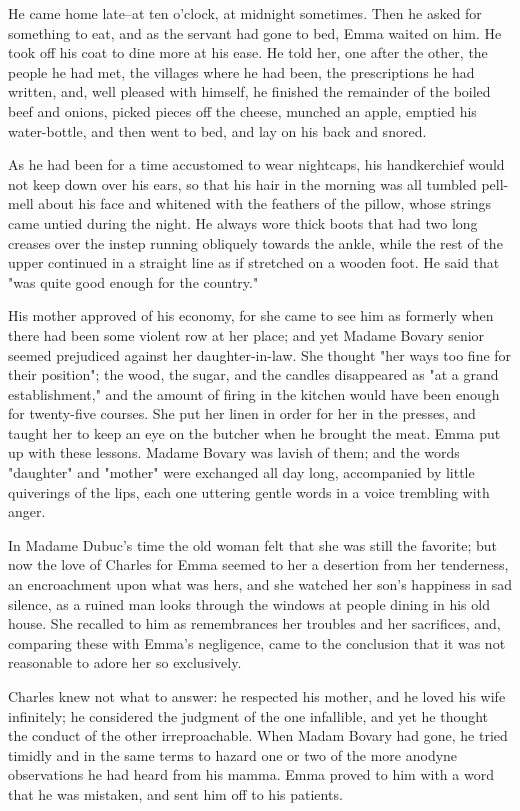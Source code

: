 \documentclass[11pt,twocolumn]{ltugboat}
\begin{document}
He came home late--at ten o'clock, at midnight sometimes. Then he asked
for something to eat, and as the servant had gone to bed, Emma waited
on him. He took off his coat to dine more at his ease. He told her, one
after the other, the people he had met, the villages where he had been,
the prescriptions he had written, and, well pleased with himself, he
finished the remainder of the boiled beef and onions, picked pieces off
the cheese, munched an apple, emptied his water-bottle, and then went to
bed, and lay on his back and snored.

As he had been for a time accustomed to wear nightcaps, his handkerchief
would not keep down over his ears, so that his hair in the morning was
all tumbled pell-mell about his face and whitened with the feathers of
the pillow, whose strings came untied during the night. He always wore
thick boots that had two long creases over the instep running obliquely
towards the ankle, while the rest of the upper continued in a straight
line as if stretched on a wooden foot. He said that "was quite good
enough for the country."

His mother approved of his economy, for she came to see him as formerly
when there had been some violent row at her place; and yet Madame Bovary
senior seemed prejudiced against her daughter-in-law. She thought "her
ways too fine for their position"; the wood, the sugar, and the candles
disappeared as "at a grand establishment," and the amount of firing in
the kitchen would have been enough for twenty-five courses. She put her
linen in order for her in the presses, and taught her to keep an eye on
the butcher when he brought the meat. Emma put up with these lessons.
Madame Bovary was lavish of them; and the words "daughter" and "mother"
were exchanged all day long, accompanied by little quiverings of the
lips, each one uttering gentle words in a voice trembling with anger.

In Madame Dubuc's time the old woman felt that she was still the
favorite; but now the love of Charles for Emma seemed to her a desertion
from her tenderness, an encroachment upon what was hers, and she watched
her son's happiness in sad silence, as a ruined man looks through
the windows at people dining in his old house. She recalled to him as
remembrances her troubles and her sacrifices, and, comparing these with
Emma's negligence, came to the conclusion that it was not reasonable to
adore her so exclusively.

Charles knew not what to answer: he respected his mother, and he loved
his wife infinitely; he considered the judgment of the one infallible,
and yet he thought the conduct of the other irreproachable. When Madam
Bovary had gone, he tried timidly and in the same terms to hazard one or
two of the more anodyne observations he had heard from his mamma. Emma
proved to him with a word that he was mistaken, and sent him off to his
patients.
\end{document}
